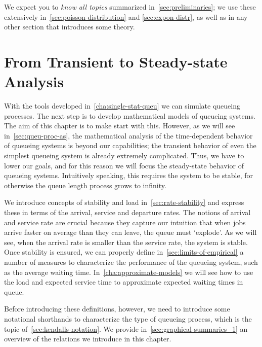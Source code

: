 We expect you to \emph{know all topics} summarized in~\cref{sec:preliminaries}; we use these extensively in~\cref{sec:poisson-distribution} and \cref{sec:expon-distr}, as well as in any other section that introduces some theory.






\chapter{From Transient to Steady-state Analysis}
\label{cha:from-trans-steady}


With the tools developed in~\cref{cha:single-stat-queu} we can simulate queueing processes.
The next step is to develop mathematical models of queueing systems.
The aim of this chapter is to make start with this.
However, as we will see in~\cref{sec:queu-proc-as}, the mathematical analysis of the time-dependent behavior of queueing systems is beyond our capabilities; the transient behavior of even the simplest queueing system is already extremely complicated.
Thus, we have to lower our goals, and for this reason we will focus the steady-state behavior of queueing systems.
Intuitively speaking, this requires the system to be stable, for otherwise the queue length process grows to infinity.

We introduce concepts of stability and load in~\cref{sec:rate-stability} and express these in terms of the arrival, service and departure rates.
The notions of arrival and service rate are crucial because they capture our intuition that when jobs arrive faster on average than they can leave, the queue must `explode'.
As we will see, when the arrival rate is smaller than the service rate, the system is stable.
Once stability is ensured, we can properly define in~\cref{sec:limits-of-empirical} a number of measures to characterize the performance of the queueing system, such as the average waiting time.
In~\cref{cha:approximate-models} we will see how to use the load and expected service time to approximate expected waiting times in queue. 

Before introducing these definitions, however, we need to introduce some notational shorthands to characterize the type of queueing process, which is the topic of~\cref{sec:kendalls-notation}.
We provide in~\cref{sec:graphical-summaries_1} an overview of the relations we introduce in this chapter.


